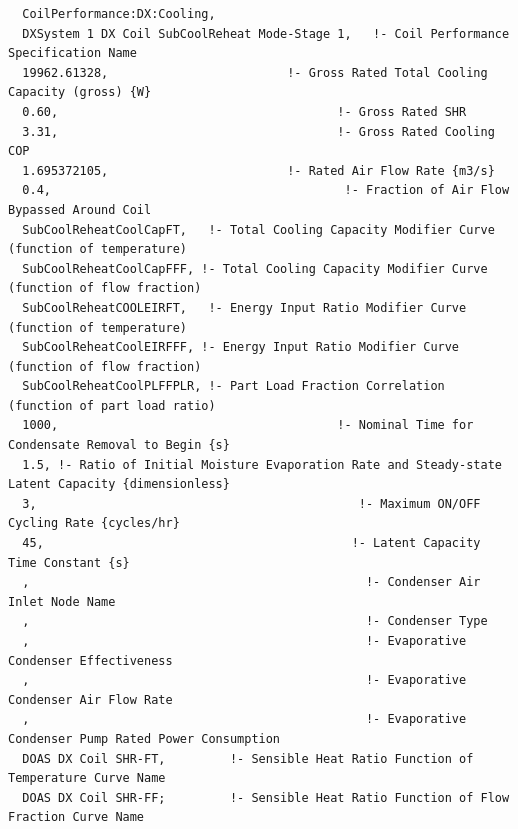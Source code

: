 \begin{lstlisting}
  CoilPerformance:DX:Cooling,
  DXSystem 1 DX Coil SubCoolReheat Mode-Stage 1,   !- Coil Performance Specification Name
  19962.61328,                         !- Gross Rated Total Cooling Capacity (gross) {W}
  0.60,                                       !- Gross Rated SHR
  3.31,                                       !- Gross Rated Cooling COP
  1.695372105,                         !- Rated Air Flow Rate {m3/s}
  0.4,                                         !- Fraction of Air Flow Bypassed Around Coil
  SubCoolReheatCoolCapFT,   !- Total Cooling Capacity Modifier Curve (function of temperature)
  SubCoolReheatCoolCapFFF, !- Total Cooling Capacity Modifier Curve (function of flow fraction)
  SubCoolReheatCOOLEIRFT,   !- Energy Input Ratio Modifier Curve (function of temperature)
  SubCoolReheatCoolEIRFFF, !- Energy Input Ratio Modifier Curve (function of flow fraction)
  SubCoolReheatCoolPLFFPLR, !- Part Load Fraction Correlation (function of part load ratio)
  1000,                                       !- Nominal Time for Condensate Removal to Begin {s}
  1.5, !- Ratio of Initial Moisture Evaporation Rate and Steady-state Latent Capacity {dimensionless}
  3,                                             !- Maximum ON/OFF Cycling Rate {cycles/hr}
  45,                                           !- Latent Capacity Time Constant {s}
  ,                                               !- Condenser Air Inlet Node Name
  ,                                               !- Condenser Type
  ,                                               !- Evaporative Condenser Effectiveness
  ,                                               !- Evaporative Condenser Air Flow Rate
  ,                                               !- Evaporative Condenser Pump Rated Power Consumption
  DOAS DX Coil SHR-FT,         !- Sensible Heat Ratio Function of Temperature Curve Name
  DOAS DX Coil SHR-FF;         !- Sensible Heat Ratio Function of Flow Fraction Curve Name



\end{lstlisting}

